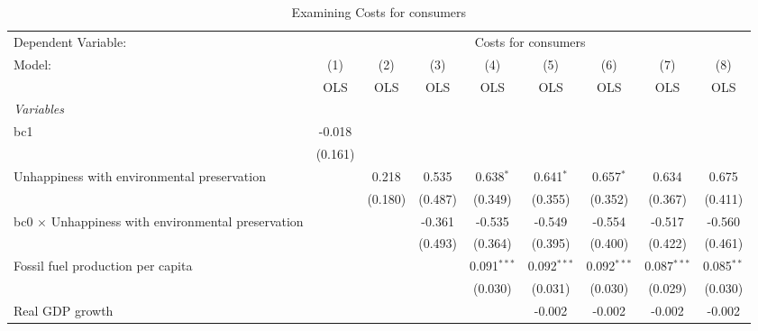 
\begin{table}[htbp]
   \caption{Examining Costs for consumers}
   \centering
   \begin{tabular}{lcccccccc}
      \toprule
      Dependent Variable: & \multicolumn{8}{c}{Costs for consumers}\\
      Model:                                                    & (1)     & (2)     & (3)     & (4)           & (5)           & (6)           & (7)           & (8)\\  
                                                                &  OLS    & OLS     & OLS     & OLS           & OLS           & OLS           & OLS           & OLS\\  
      \midrule
      \emph{Variables}\\
      bc1                                                       & -0.018  &         &         &               &               &               &               &   \\   
                                                                & (0.161) &         &         &               &               &               &               &   \\   
      Unhappiness with environmental preservation               &         & 0.218   & 0.535   & 0.638$^{*}$   & 0.641$^{*}$   & 0.657$^{*}$   & 0.634         & 0.675\\   
                                                                &         & (0.180) & (0.487) & (0.349)       & (0.355)       & (0.352)       & (0.367)       & (0.411)\\   
      bc0 $\times$ Unhappiness with environmental preservation  &         &         & -0.361  & -0.535        & -0.549        & -0.554        & -0.517        & -0.560\\   
                                                                &         &         & (0.493) & (0.364)       & (0.395)       & (0.400)       & (0.422)       & (0.461)\\   
      Fossil fuel production per capita                         &         &         &         & 0.091$^{***}$ & 0.092$^{***}$ & 0.092$^{***}$ & 0.087$^{***}$ & 0.085$^{**}$\\   
                                                                &         &         &         & (0.030)       & (0.031)       & (0.030)       & (0.029)       & (0.030)\\   
      Real GDP growth                                           &         &         &         &               & -0.002        & -0.002        & -0.002        & -0.002\\   

\end{tabular}
\end{table}
